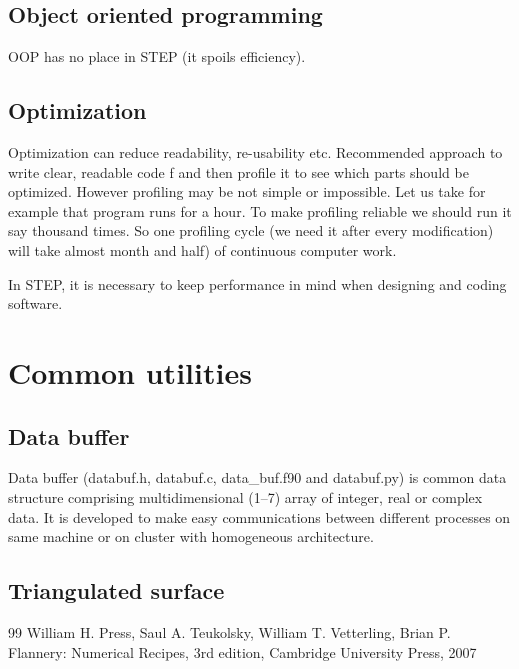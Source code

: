 \documentclass[a4paper]{report}
\begin{document}
\section{Object oriented programming}
OOP has no place in STEP (it spoils efficiency).
\section{Optimization}
Optimization can reduce readability, re-usability  etc. Recommended approach to write clear, readable code f and then profile it to see which parts should be optimized. However profiling may be not simple or impossible. Let us take for example that program runs for a hour. To make profiling reliable we should run it say thousand times. So one profiling cycle (we need it after every modification) will take almost month and half) of continuous computer work.

In STEP, it is  necessary to keep performance  in mind when designing and coding software. 

\chapter{Common utilities}

\section{Data buffer}
Data buffer (databuf.h, databuf.c, data\_buf.f90 and databuf.py) is common data structure comprising multidimensional (1--7) array of integer, real or complex data. It is developed to make easy  communications between different processes on  same machine or on cluster with homogeneous architecture.

\section{Triangulated surface}


\begin{thebibliography} {99}
     William H. Press, Saul A. Teukolsky, William T. Vetterling, Brian P. Flannery: Numerical Recipes, 3rd edition, Cambridge University Press, 2007	
\end{thebibliography}
\end{document}
